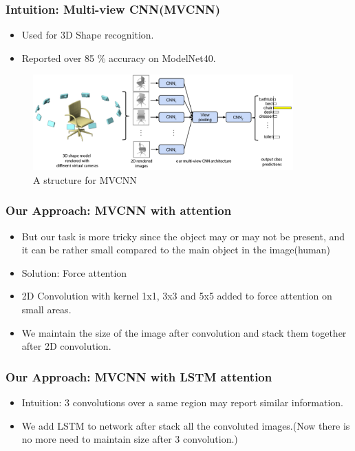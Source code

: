 \documentclass{beamer}
\begin{document}
\begin{frame}
\frametitle{Intuition: Multi-view CNN(MVCNN)\cite{su15mvcnn}}

	\begin{itemize}
		\item Used for 3D Shape recognition.
		\item Reported over 85 \% accuracy on ModelNet40.
	\end{itemize}
	\begin{figure}
		\centering
		\includegraphics[width=10cm]{../Pic/mvcnn.png}
		\caption{A structure for MVCNN}
	\end{figure}

\end{frame}

\begin{frame}
\frametitle{Our Approach: MVCNN with attention}

	\begin{itemize}
		\item But our task is more tricky since the object may or may not be present, and it can be rather small compared to the main object in the image(human)
		\item Solution: Force attention
		\item 2D Convolution with kernel 1x1, 3x3 and 5x5 added to force attention on small areas.
		\item We maintain the size of the image after convolution and stack them together after 2D convolution.
	\end{itemize}

\end{frame}

\begin{frame}
\frametitle{Our Approach: MVCNN with LSTM attention}

	\begin{itemize}
		\item Intuition: 3 convolutions over a same region may report similar information.
		\item We add LSTM to network after stack all the convoluted images.(Now there is no more need to maintain size after 3 convolution.)
	\end{itemize}

\end{frame}
\end{document}
